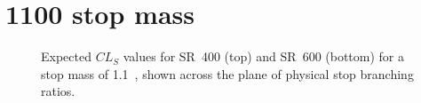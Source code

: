 \FloatBarrier

\newpage
\section{1100 \texorpdfstring{\GeV}{GeV} stop mass}

\begin{figure}[ht]
  \centering
  \caption{
    Expected
    $CL_S$ values for SR~400 (top) and SR~600 (bottom) for a stop mass of
    1.1~\TeV,
    shown across the plane of physical stop branching ratios.
  }
\end{figure}

